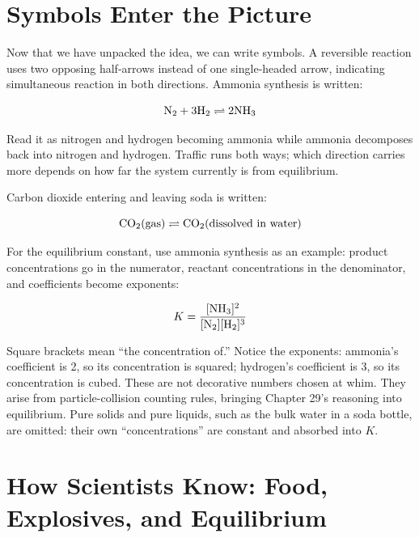 \section{Symbols Enter the Picture}

Now that we have unpacked the idea, we can write symbols. A reversible reaction uses two opposing half-arrows instead of one single-headed arrow, indicating simultaneous reaction in both directions. Ammonia synthesis is written:

\[\mathrm{N_2} + \mathrm{3H_2} \rightleftharpoons \mathrm{2NH_3}\]

Read it as nitrogen and hydrogen becoming ammonia while ammonia decomposes back into nitrogen and hydrogen. Traffic runs both ways; which direction carries more depends on how far the system currently is from equilibrium.

Carbon dioxide entering and leaving soda is written:

\[\mathrm{CO_2}\text{(gas)} \rightleftharpoons \mathrm{CO_2}\text{(dissolved in water)}\]

For the equilibrium constant, use ammonia synthesis as an example: product concentrations go in the numerator, reactant concentrations in the denominator, and coefficients become exponents:

\[K=\frac{[\mathrm{NH_3}]^{2}}{[\mathrm{N_2}][\mathrm{H_2}]^{3}}\]

Square brackets mean ``the concentration of.'' Notice the exponents: ammonia's coefficient is 2, so its concentration is squared; hydrogen's coefficient is 3, so its concentration is cubed. These are not decorative numbers chosen at whim. They arise from particle-collision counting rules, bringing Chapter 29's reasoning into equilibrium. Pure solids and pure liquids, such as the bulk water in a soda bottle, are omitted: their own ``concentrations'' are constant and absorbed into $K$.

\section{How Scientists Know: Food, Explosives, and Equilibrium}

